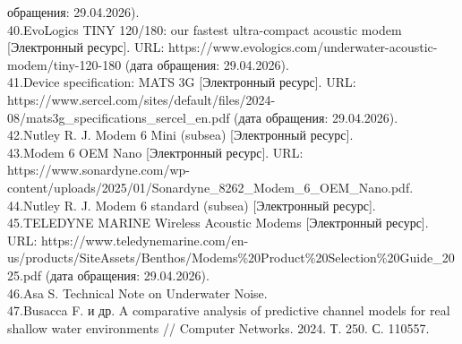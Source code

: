 {обращения: 29.04.2026).\\
40.EvoLogics TINY 120/180: our fastest ultra-compact acoustic modem
{[}Электронный ресурс{]}. URL:
https://www.evologics.com/underwater-acoustic-modem/tiny-120-180 (дата
обращения: 29.04.2026).\\
41.Device specification: MATS 3G {[}Электронный ресурс{]}. URL:
https://www.sercel.com/sites/default/files/2024-08/mats3g\_specifications\_sercel\_en.pdf
(дата обращения: 29.04.2026).\\
42.Nutley R. J. Modem 6 Mini (subsea) {[}Электронный ресурс{]}.\\
43.Modem 6 OEM Nano {[}Электронный ресурс{]}. URL:
https://www.sonardyne.com/wp-content/uploads/2025/01/Sonardyne\_8262\_Modem\_6\_OEM\_Nano.pdf.\\
44.Nutley R. J. Modem 6 standard (subsea) {[}Электронный ресурс{]}.\\
45.TELEDYNE MARINE Wireless Acoustic Modems {[}Электронный ресурс{]}.
URL:
https://www.teledynemarine.com/en-us/products/SiteAssets/Benthos/Modems\%20Product\%20Selection\%20Guide\_2025.pdf
(дата обращения: 29.04.2026).\\
46.Asa S. Technical Note on Underwater Noise.\\
47.Busacca F. и др. A comparative analysis of predictive channel models
for real shallow water environments // Computer Networks. 2024. Т. 250.
С. 110557.}

\hl{}
